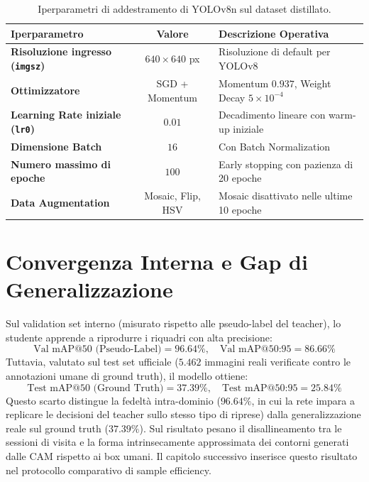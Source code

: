 \begin{table}[htbp]
\centering
\small
\begin{tabularx}{\textwidth}{lcL}
\toprule
\textbf{Iperparametro} & \textbf{Valore} & \textbf{Descrizione Operativa} \\
\midrule
\textbf{Risoluzione ingresso (\texttt{imgsz})} & $640 \times 640$ px & Risoluzione di default per YOLOv8 \\
\textbf{Ottimizzatore} & SGD + Momentum & Momentum $0.937$, Weight Decay $5 \times 10^{-4}$ \\
\textbf{Learning Rate iniziale (\texttt{lr0})} & $0.01$ & Decadimento lineare con warm-up iniziale \\
\textbf{Dimensione Batch} & $16$ & Con Batch Normalization \\
\textbf{Numero massimo di epoche} & $100$ & Early stopping con pazienza di 20 epoche \\
\textbf{Data Augmentation} & Mosaic, Flip, HSV & Mosaic disattivato nelle ultime 10 epoche \\
\bottomrule
\end{tabularx}
\caption{Iperparametri di addestramento di YOLOv8n sul dataset distillato.}
\label{tab:iperparametri_yolo}
\end{table}

\section{Convergenza Interna e Gap di Generalizzazione}
\label{sec:dist_gap}
Sul validation set interno (misurato rispetto alle pseudo-label del teacher), lo studente apprende a riprodurre i riquadri con alta precisione:
\begin{equation}
    \text{Val mAP@50 (Pseudo-Label)} = 96.64\%, \quad \text{Val mAP@50:95} = 86.66\%
\end{equation}
Tuttavia, valutato sul test set ufficiale ($5.462$ immagini reali verificate contro le annotazioni umane di ground truth), il modello ottiene:
\begin{equation}
    \text{Test mAP@50 (Ground Truth)} = 37.39\%, \quad \text{Test mAP@50:95} = 25.84\%
\end{equation}
Questo scarto distingue la fedeltà intra-dominio ($96.64\%$, in cui la rete impara a replicare le decisioni del teacher sullo stesso tipo di riprese) dalla generalizzazione reale sul ground truth ($37.39\%$). Sul risultato pesano il disallineamento tra le sessioni di visita e la forma intrinsecamente approssimata dei contorni generati dalle CAM rispetto ai box umani. Il capitolo successivo inserisce questo risultato nel protocollo comparativo di sample efficiency.
